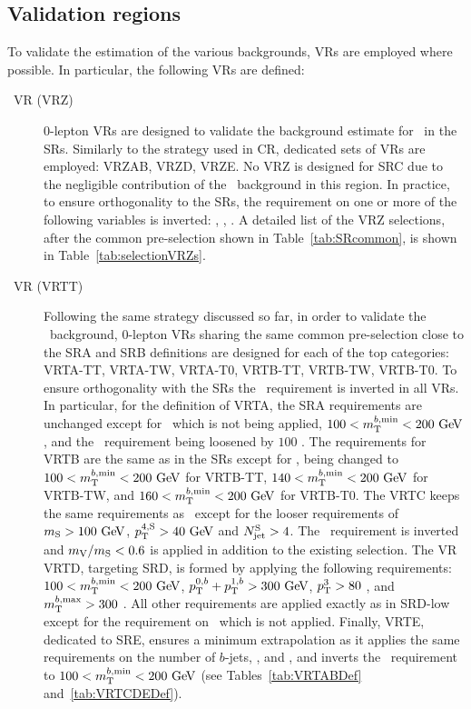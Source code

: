 

		\subsection{Validation regions}

			To validate the estimation of the various backgrounds, \acp{VR} are employed where possible. In particular, the following \acp{VR} are defined:

			\begin{description}

				\item [\Zjets\ VR (VRZ)] $0$-lepton \acp{VR} are designed to validate the background estimate for \Zjets\ in the \acp{SR}. Similarly to the strategy used in \ac{CR}, dedicated sets of \acp{VR} are employed: VRZAB, VRZD, VRZE. No VRZ is designed for SRC due to the negligible contribution of the \Zboson\ background in this region. In practice, to ensure orthogonality to the \acp{SR}, the requirement on one or more of the following variables is inverted: \drbjetbjet, \mantikttwelvezero, \mantikteightzero. A detailed list of the VRZ selections, after the common pre-selection shown in Table~\ref{tab:SRcommon}, is shown in Table~\ref{tab:selectionVRZs}.

				\item [\ttbar\ VR (VRTT)] Following the same strategy discussed so far, in order to validate the \ttbar\ background, $0$-lepton \acp{VR} sharing the same common pre-selection close to the SRA and SRB definitions are designed for each of the top categories: VRTA-TT, VRTA-TW, VRTA-T0, VRTB-TT, VRTB-TW, VRTB-T0. To ensure orthogonality with the \acp{SR} the \mtbmin\ requirement is inverted in all \acp{VR}. In particular, for the definition of VRTA, the SRA requirements are unchanged except for \mttwo\, which is not being applied, $100<\mtbmin<200\gev$, and the \met\ requirement being loosened by $100$ \GeV. The requirements for VRTB are the same as in the \acp{SR} except for \mtbmin, being changed to $100<\mtbmin<200\gev$ for VRTB-TT, $140<\mtbmin<200\gev$ for VRTB-TW, and $160<\mtbmin<200\gev$ for VRTB-T0. The VRTC keeps the same requirements as \SRC\ except for the looser requirements of $\mS> 100\gev$, $\pTSFour>40\gev$ and $N_{\mathrm{jet}}^{\mathrm{S}} > 4$. The \dPhiISRMET\ requirement is inverted and $m_{\mathrm{V}}/m_{\mathrm{S}}<0.6$ is applied in addition to the existing selection. The \ac{VR} VRTD, targeting SRD, is formed by applying the following requirements: $100<\mtbmin<200\gev$, $\ptbzero+\ptbone>300\gev$, $p_{\mathrm{T}}^{3}>80$ \GeV, and $m_{\mathrm{T}}^{b,\mathrm{max}}>300$ \GeV. All other requirements are applied exactly as in SRD-low except for the requirement on \ptfour\ which is not applied. Finally, VRTE, dedicated to SRE, ensures a minimum extrapolation as it applies the same requirements on the number of $b$-jets, \mantikteightzero, and \mantikteightone, and inverts the \mtbmin\ requirement to $100<\mtbmin<200\gev$ (see Tables~\ref{tab:VRTABDef} and~\ref{tab:VRTCDEDef}).


\end{description}

